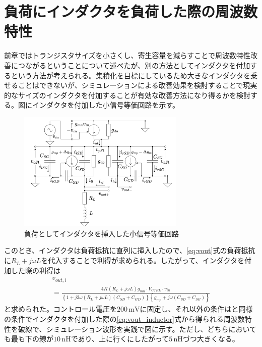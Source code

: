 \documentclass[twocolumn]{jsarticle}
\begin{document}
\section{負荷にインダクタを負荷した際の周波数特性}
    前章ではトランジスタサイズを小さくし、寄生容量を減らすことで周波数特性改善につながるということについて述べたが、別の方法としてインダクタを付加するという方法が考えられる。集積化を目標にしているため大きなインダクタを乗せることはできないが、シミュレーションによる改善効果を検討することで現実的なサイズのインダクタを付加することが有効な改善方法になり得るかを検討する。図にインダクタを付加した小信号等価回路を示す。
    \begin{figure}[H]
        \begin{center}
            \includegraphics*[width = 80mm]{figures/ParasiticInductorHalfEquivalent.png}
            \caption{負荷としてインダクタを挿入した小信号等価回路}
            \label{fig:inductor}
        \end{center}
    \end{figure}
    このとき、インダクタは負荷抵抗に直列に挿入したので、\eqref{eq:vout}式の負荷抵抗に$R_{L}+j\omega L$を代入することで利得が求められる。したがって、インダクタを付加した際の利得は
    \begin{multline}
        v_{out,i} \\
        = \frac{4K(R_{L}+j\omega L)g_{mn}\cdot V_{CTRL}\cdot v_{in}}{ \left\{ 1+j2\omega(R_{L}+j\omega L)(C_{SD}+C_{GD}) \right\}\left\{ g_{mp}+j\omega(C_{SD}+C_{SG}) \right\} }    \label{eq:vout_inductor}
    \end{multline}
    と求められた。コントロール電圧を$200\,\mathrm{mV}$に固定し、それ以外の条件はと同様の条件でインダクタを付加した際の\eqref{eq:vout_inductor}式から得られる周波数特性を破線で、シミュレーション波形を実践で図に示す。ただし、どちらにおいても最も下の線が$10\,\mathrm{nH}$であり、上に行くにしたがって$5\,\mathrm{nH}$づつ大きくなる。
\end{document}
